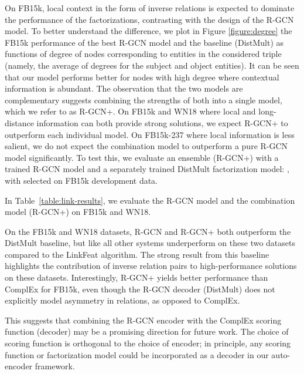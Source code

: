 \documentclass[letterpaper]{article} \usepackage{aaai18}  \usepackage{times}  \usepackage{helvet}  \usepackage{courier}  \usepackage{url}  \usepackage{graphicx}  \frenchspacing
\begin{document}
On FB15k, local context in the form of inverse relations is expected to dominate the performance of the factorizations, contrasting with the design of the R-GCN model. To better understand the difference, we plot in Figure \ref{figure:degree} the FB15k performance of the best R-GCN model and the baseline (DistMult) as functions of degree of nodes corresponding to entities in the considered triple
(namely, the average of degrees for the subject and object entities). It can be seen that our model performs better for nodes with high degree where contextual information is abundant. The observation that the two models are complementary suggests combining the strengths of both into a single model, which we refer to as R-GCN+. On FB15k and WN18 where local and long-distance information can both provide strong solutions, we expect R-GCN+ to outperform each individual model. On FB15k-237 where local information is less salient, we do not expect the combination model to outperform a pure R-GCN model significantly. To test this, we evaluate an ensemble (R-GCN+) with a trained R-GCN model and a separately trained DistMult factorization model: , with  selected on FB15k development data.

In Table~\ref{table:link-results}, we evaluate the R-GCN model and the combination model (R-GCN+) on FB15k and WN18.

On the FB15k and WN18 datasets, R-GCN and R-GCN+ both outperform the DistMult baseline, but like all other systems underperform on these two datasets compared to the LinkFeat algorithm. The strong result from this baseline highlights the contribution of inverse relation pairs to high-performance solutions on these datasets. Interestingly, R-GCN+ yields better performance than ComplEx for FB15k, even though the R-GCN decoder (DistMult) does not explicitly model asymmetry in relations, as opposed to ComplEx.

This suggests that combining the R-GCN encoder with the ComplEx scoring function (decoder) may be a promising direction for future work. The choice of scoring function is orthogonal to the choice of encoder; in principle, any scoring function or factorization model could be incorporated as a decoder in our auto-encoder framework.
\end{document}
